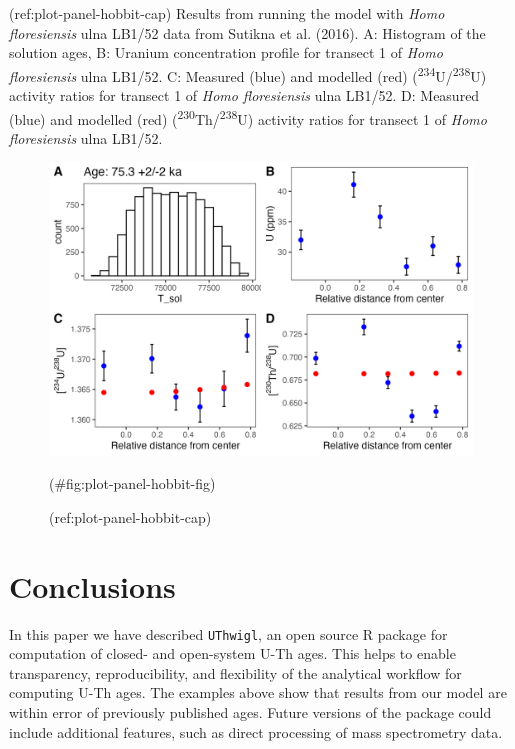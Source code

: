 \documentclass[]{elsarticle} %
\begin{document}
\newpage

(ref:plot-panel-hobbit-cap) Results from running the model with \emph{Homo floresiensis} ulna LB1/52 data from Sutikna et al. (2016). A: Histogram of the solution ages, B: Uranium concentration profile for transect 1 of \emph{Homo floresiensis} ulna LB1/52. C: Measured (blue) and modelled (red) (\textsuperscript{234}U/\textsuperscript{238}U) activity ratios for transect 1 of \emph{Homo floresiensis} ulna LB1/52. D: Measured (blue) and modelled (red) (\textsuperscript{230}Th/\textsuperscript{238}U) activity ratios for transect 1 of \emph{Homo floresiensis} ulna LB1/52.

\begin{figure}
\includegraphics[width=0.95\linewidth]{figures/plot-panel-hobbit} \caption{(ref:plot-panel-hobbit-cap)}(\#fig:plot-panel-hobbit-fig)
\end{figure}

\FloatBarrier

\hypertarget{conclusions}{%
\section{Conclusions}\label{conclusions}}

In this paper we have described \texttt{UThwigl}, an open source R package for computation of closed- and open-system U-Th ages. This helps to enable transparency, reproducibility, and flexibility of the analytical workflow for computing U-Th ages. The examples above show that results from our model are within error of previously published ages.
Future versions of the package could include additional features, such as direct processing of mass spectrometry data.
\end{document}
